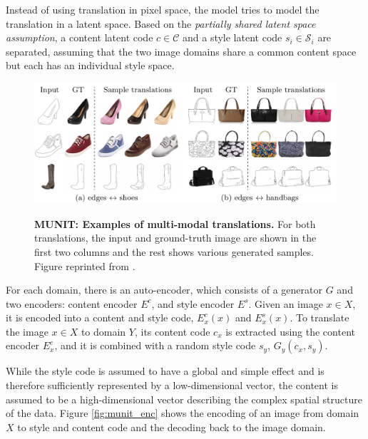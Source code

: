 \documentclass{article}
\begin{document}
Instead of using translation in pixel space, the model tries to model the translation in a latent space. Based on the \textit{partially shared latent space assumption}, a content latent code $c \in \mathcal{C}$ and a style latent code $s_{i} \in \mathcal{S}_{i}$ are separated, assuming that the two image domains share a common content space but each has an individual style space. 

\begin{figure}[h]
\centering
{\includegraphics[width=\linewidth]{GAN/munit_example}}
\caption{\label{fig:munit_example} \textbf{MUNIT: Examples of multi-modal translations.} For both translations, the input and ground-truth image are shown in the first two columns and the rest shows various generated samples. Figure reprinted from \cite{huang_multimodal_2018}.}
\end{figure}


For each domain, there is an auto-encoder, which consists of a generator $G$ and two encoders: content encoder $E^c$, and style encoder $E^s$. Given an image $x \in X$, it is encoded into a content and style code, $E^c_x(x)$ and $E^s_x(x)$. To translate the image $x \in X$ to domain $Y$, its content code $c_{x}$ is extracted using the content encoder $E^c_x$, and it is combined with a random style code $s_{y}$, $G_y(c_x, s_y)$. 

While the style code is assumed to have a global and simple effect and is therefore sufficiently represented by a low-dimensional vector, the content is assumed to be a high-dimensional vector describing the complex spatial structure of the data. Figure \ref{fig:munit_enc} shows the encoding of an image from domain $X$ to style and content code and the decoding back to the image domain.
\end{document}
